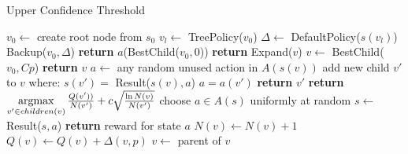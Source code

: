 \documentclass{ba-kecs}
\begin{document}
\begin{algorithm}
	\caption{Upper Confidence Threshold}
    \label{UCT}
    \begin{algorithmic}
        	\State $v_0 \leftarrow$ create root node from $s_0$
            	\State $v_l \leftarrow$ TreePolicy($v_0$)
                \State $\Delta \leftarrow$ DefaultPolicy($s(v_l)$)
                \State Backup($v_0, \Delta$)
            \EndWhile
            \State \textbf{return} $a$(BestChild($v_0,0$))
        \EndFunction
        \State
                	\State \textbf{return} Expand($v$)
                \Else
                	\State $v \leftarrow$ BestChild($v_0,Cp$)
                \EndIf
            \EndWhile
           	\State \textbf{return} $v$
        \EndFunction
        \State
        	\State $a\leftarrow$ any random unused action in $A(s(v))$
            \State add new child $v'$ to $v$ where:
            \State $s(v') =$ Result($s(v),a$)
            \State $a = a(v')$
            \State \textbf{return} $v'$
        \EndFunction
        \State
        	\State \textbf{return} $\operatornamewithlimits{arg max}\limits_{v' \in children(v)}\frac{Q(v'))}{N(v')} + c\sqrt{\frac{\ln N(v)}{N(v')}}
$
        \EndFunction
        \State
            	\State choose $a \in A(s)$ uniformly at random
                \State $s \leftarrow$ Result($s, a$)
                \State \textbf{return} reward for state $a$
            \EndWhile
        \EndFunction
        \State
            	\State $N(v) \leftarrow N(v)+1$
                \State $Q(v) \leftarrow Q(v)+\Delta(v,p)$
                \State $v \leftarrow$ parent of $v$
            \EndWhile
        \EndFunction
    \end{algorithmic}
\end{algorithm}
\end{document}
